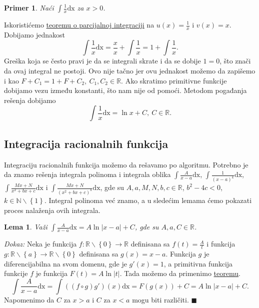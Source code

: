 \documentclass{article}
\newtheorem{lema}{Lema}[section]
\newtheorem{prim}{Primer}[section]
\begin{document}
\begin{primbox}
    \label{primer_1.14}
    \begin{prim}
        Naći $\displaystyle\int \frac{1}{x} \text{dx}$ za $x > 0$.
    \end{prim}
    Iskoristićemo \hyperref[teorema_1.4]{teoremu o parcijalnoj integraciji} na $\displaystyle u\left(x\right)  = \frac{1}{x}$ i
    $v\left(x\right) = x$.
    Dobijamo jednakost
    $$\int \frac{1}{x} \text{dx} = \frac{x}{x} + \int \frac{1}{x} = 1+ \int\frac{1}{x}.$$
    Greška koja se često pravi je da se integrali skrate i da se dobije $1 = 0$, što znači da ovaj integral ne postoji.
    Ovo nije tačno jer ovu jednakost možemo da zapišemo i kao $F+C_1 = 1+F+C_2,\ C_1,C_2\in\mathbb{R}$.
    Ako skratimo primitivne funkcije dobijamo vezu između konstanti, što nam nije od pomoći. Metodom pogađanja
    rešenja dobijamo $$\int\frac{1}{x}\text{dx}=\ln x+C,\ C\in\mathbb{R}.$$
\end{primbox}

\subsection{Integracija racionalnih funkcija}

Integraciju racionalnih funkcija možemo da rešavamo po algoritmu.
Potrebno je da znamo rešenja integrala polinoma i integrala
oblika
$\displaystyle\int \frac{A}{x-a}\text{dx}$, $\displaystyle\int\frac{1}{\left(x-a\right)^k}\text{dx}$,
$\displaystyle\int \frac{Mx+N}{x^2+bx + c}\text{dx}$ i $\displaystyle\int \frac{Mx + N}{\left(x^2 + bx + c\right)^k}\text{dx}$,
gde su $A,a,M,N,b,c\in\mathbb{R}$, $b^2-4c<0$, $k\in\mathbb{N}\backslash\left\{1\right\}$.
Integral polinoma već znamo, a u sledećim lemama ćemo
pokazati proces nalaženja ovih integrala.

\begin{lemabox}
    \label{lema_1.1}
    \begin{lema}
        Važi $\displaystyle\int \frac{A}{x-a}\text{dx}=A\ln|x-a| + C$, gde su $A,a,C\in \mathbb{R}$.
    \end{lema}
\end{lemabox}

\textit{Dokaz:} Neka je funkcija $f:\mathbb{R}\backslash\left\{0\right\}\longrightarrow\mathbb{R}$ definisana sa
$\displaystyle f\left(t\right)=\frac{A}{t}$ i funkcija $g:\mathbb{R}\backslash\left\{a\right\}\longrightarrow\mathbb{R}\backslash\left\{0\right\}$
definisana sa $g\left(x\right)=x-a$. Funkcija $g$ je diferencijabilna na svom domenu, gde je $g'\left(x\right)=1$, a primitivna funkcija
funkcije $f$ je funkcija $F\left(t\right)=A\ln|t|$. Tada možemo da primenimo \hyperref[teorema_1.2]{teoremu}.
$$ \int \frac{A}{x-a}\text{dx} = \int \left(\left(f\circ g\right) g'\right)\left(x\right)\text{dx} = F\left(g\left(x\right)\right) + C=A\ln|x-a| + C.$$
Napomenimo da $C$ za $x > a$ i $C$ za $x < a$ mogu biti različiti.
\null\hfill $\blacksquare$\par
\end{document}
